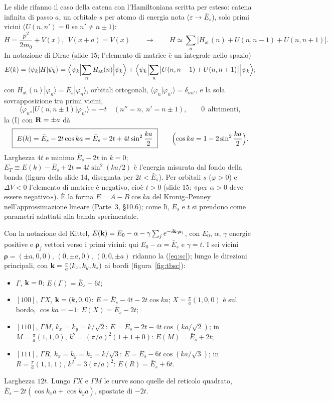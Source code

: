 \documentclass[11pt,a4paper]{article}
\begin{document}
Le slide rifanno il caso della catena con l'Hamiltoniana scritta per esteso: catena infinita di passo $a$, un orbitale $s$ per atomo di energia nota
($\varepsilon\to\bar E_s$), solo primi vicini ($U(n,n')=0$ se $n'\ne n\pm1$):
\[
H=\frac{p^2}{2m_0}+V(x),\ \ V(x+a)=V(x)\qquad\longrightarrow\qquad H\simeq\sum_n\bigl[H_{\mathrm{at}}(n)+U(n,n-1)+U(n,n+1)\bigr].
\]
In notazione di Dirac (slide 15; l'elemento di matrice è un integrale nello spazio)
\[
E(k)=\langle\psi_k|H|\psi_k\rangle=\Bigl\langle\psi_k\Bigl|\sum_nH_{\mathrm{at}}(n)\Bigr|\psi_k\Bigr\rangle+\Bigl\langle\psi_k\Bigl|\sum_n\bigl[U(n,n-1)+U(n,n+1)\bigr]\Bigr|\psi_k\Bigr\rangle;
\]
con $H_{\mathrm{at}}(n)|\varphi_n\rangle=\bar E_s|\varphi_n\rangle$, orbitali ortogonali, $\langle\varphi_n|\varphi_{n'}\rangle=\delta_{nn'}$, e la sola sovrapposizione tra
primi vicini,
\[
\langle\varphi_{n''}|U(n,n\pm1)|\varphi_{n'}\rangle=-t\quad(n''=n,\ n'=n\pm1),\qquad 0\ \ \text{altrimenti},
\]
la (I) con $\mathbf R=\pm a$ dà
\[
\boxed{\ E(k)=\bar E_s-2t\cos ka=\bar E_s-2t+4t\sin^2\frac{ka}2\ }\qquad\Bigl(\cos ka=1-2\sin^2\frac{ka}2\Bigr).
\]
Larghezza $4t$ e minimo $\bar E_s-2t$ in $k=0$; $E_T\equiv E(k)-\bar E_s+2t=4t\sin^2(ka/2)$ è l'energia misurata dal fondo della banda (figura
della slide 14, disegnata per $2t<\bar E_s$). Per orbitali $s$ ($\varphi>0$) e $\Delta V<0$ l'elemento di matrice è negativo, cioè $t>0$ (slide 15: «per $\alpha>0$ deve essere
negativo»). È la forma $E=A-B\cos ka$ del Kronig--Penney nell'approssimazione lineare (Parte~3, §10.6); come lì, $\bar E_s$ e $t$ si prendono come
parametri adattati alla banda sperimentale.

\begin{esempio}
Con la notazione del Kittel, $E(\mathbf k)=E_0-\alpha-\gamma\sum_je^{-i\mathbf k\cdot\boldsymbol\rho_j}$, con $E_0$, $\alpha$, $\gamma$ energie positive e
$\boldsymbol\rho_j$ vettori verso i primi vicini: qui $E_0-\alpha=\bar E_s$ e $\gamma=t$. I sei vicini $\boldsymbol\rho=(\pm a,0,0)$, $(0,\pm a,0)$,
$(0,0,\pm a)$ ridanno la (\ref{eq:sc}); lungo le direzioni principali, con $\mathbf k=\frac\pi a(k_x,k_y,k_z)$ ai bordi (figura~\ref{fig:tbsc}):
\begin{itemize}[leftmargin=*]
\item $\Gamma$, $\mathbf k=0$: $E(\Gamma)=\bar E_s-6t$;
\item $[100]$, $\Gamma X$, $\mathbf k=(k,0,0)$: $E=\bar E_s-4t-2t\cos ka$; $X=\frac\pi a(1,0,0)$ è sul bordo, $\cos ka=-1$: $E(X)=\bar E_s-2t$;
\item $[110]$, $\Gamma M$, $k_x=k_y=k/\sqrt2$: $E=\bar E_s-2t-4t\cos(ka/\sqrt2)$; in $M=\frac\pi a(1,1,0)$, $k^2=(\pi/a)^2(1+1+0)$: $E(M)=\bar E_s+2t$;
\item $[111]$, $\Gamma R$, $k_x=k_y=k_z=k/\sqrt3$: $E=\bar E_s-6t\cos(ka/\sqrt3)$; in $R=\frac\pi a(1,1,1)$, $k^2=3(\pi/a)^2$: $E(R)=\bar E_s+6t$.
\end{itemize}
Larghezza $12t$. Lungo $\Gamma X$ e $\Gamma M$ le curve sono quelle del reticolo quadrato, $\bar E_s-2t(\cos k_xa+\cos k_ya)$, spostate di $-2t$.
\end{esempio}
\end{document}
